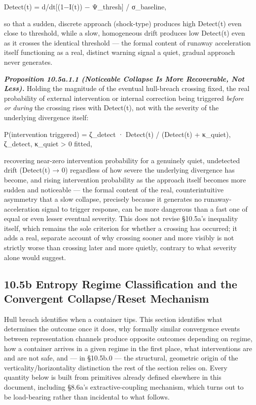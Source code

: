 \documentclass[
]{article}
\begin{document}
Detect(t) = \textbar d/dt{[}(1−I(t)) − Ψ\_thresh{]}\textbar{} /
σ\_baseline,

so that a sudden, discrete approach (shock-type) produces high Detect(t)
even close to threshold, while a slow, homogeneous drift produces low
Detect(t) even as it crosses the identical threshold --- the formal
content of runaway acceleration itself functioning as a real, distinct
warning signal a quiet, gradual approach never generates.

\emph{\textbf{Proposition 10.5a.1.1 (Noticeable Collapse Is More
Recoverable, Not Less).}} Holding the magnitude of the eventual
hull-breach crossing fixed, the real probability of external
intervention or internal correction being triggered \emph{before or
during} the crossing rises with Detect(t), not with the severity of the
underlying divergence itself:

P(intervention triggered) = ζ\_detect · Detect(t) / (Detect(t) +
κ\_quiet), ζ\_detect, κ\_quiet \textgreater{} 0 fitted,

recovering near-zero intervention probability for a genuinely quiet,
undetected drift (Detect(t) → 0) regardless of how severe the underlying
divergence has become, and rising intervention probability as the
approach itself becomes more sudden and noticeable --- the formal
content of the real, counterintuitive asymmetry that a slow collapse,
precisely because it generates no runaway-acceleration signal to trigger
response, can be more dangerous than a fast one of equal or even lesser
eventual severity. This does not revise §10.5a's inequality itself,
which remains the sole criterion for whether a crossing has occurred; it
adds a real, separate account of why crossing sooner and more visibly is
not strictly worse than crossing later and more quietly, contrary to
what severity alone would suggest.

\hypertarget{b-entropy-regime-classification-and-the-convergent-collapsereset-mechanism}{%
\subsection{10.5b Entropy Regime Classification and the Convergent
Collapse/Reset
Mechanism}\label{b-entropy-regime-classification-and-the-convergent-collapsereset-mechanism}}

Hull breach identifies when a container tips. This section identifies
what determines the outcome once it does, why formally similar
convergence events between representation channels produce opposite
outcomes depending on regime, how a container arrives in a given regime
in the first place, what interventions are and are not safe, and --- in
§10.5b.0 --- the structural, geometric origin of the
verticality/horizontality distinction the rest of the section relies on.
Every quantity below is built from primitives already defined elsewhere
in this document, including §8.6a's extractive-coupling mechanism, which
turns out to be load-bearing rather than incidental to what follows.
\end{document}
